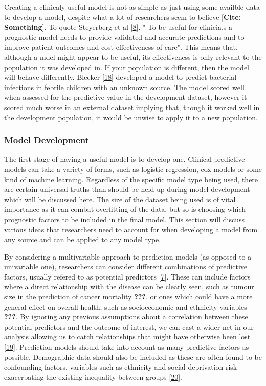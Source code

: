 \documentclass[12pt,PhD,twoside,openright]{muthesis}
\begin{document}
Creating a clinicaly useful model is not as simple as just using some availble data to develop a model, despite what a lot of researchers seem to believe {[}\textbf{Cite: Something}{]}. To quote Steyerberg et al {[}\protect\hyperlink{ref-steyerberg_prognosis_2013}{8}{]}. " To be useful for clinicia,s a prognostic model needs to provide validated and accurate predictions and to improve patient outcomes and cost-effectiveness of care". This means that, although a mdel might appear to be useful, its effectiveness is only relevant to the population it was developed in. If your population is different, then the model will behave differently. Bleeker {[}\protect\hyperlink{ref-bleeker_external_2003}{18}{]} developed a model to predict bacterial infections in febrile children with an unknown source. The model scored well when assessed for the predictive value in the development dataset, however it scored much worse in an external dataset implying that, though it worked well in the development population, it would be unwise to apply it to a new population.

\hypertarget{model-development}{%
\subsubsection{Model Development}\label{model-development}}

The first stage of having a useful model is to develop one. Clinical predictive models can take a variety of forms, such as logistic regression, cox models or some kind of machine learning. Regardless of the specific model type being used, there are certain universal truths than should be held up during model development which will be discussed here. The size of the dataset being used is of vital importance as it can combat overfitting of the data, but so is choosing which prognostic factors to be included in the final model. This section will discuss various ideas that researchers need to account for when developing a model from any source and can be applied to any model type.

By considering a multivariable approach to prediction models (as opposed to a univariable one), researchers can consider different combinations of predictive factors, usually refered to as potential predictors {[}\protect\hyperlink{ref-riley_prognosis_2013}{7}{]}. These can include factors where a direct relationship with the disease can be clearly seen, such as tumour size in the prediction of cancer mortality {\textbf{???}}, or ones which could have a more general effect on overall health, such as socioeconomic and ethnicity variables {\textbf{???}}. By ignoring any previous assumptions about a correlation between these potential predictors and the outcome of interest, we can cast a wider net in our analysis allowing us to catch relationships that might have otherwise been lost {[}\protect\hyperlink{ref-hanauer_exploring_2009}{19}{]}. Prediction models should take into account as many predictive factors as possible. Demographic data should also be included as these are often found to be confounding factors, variables such as ethnicity and social deprivation risk exacerbating the existing inequality between groups {[}\protect\hyperlink{ref-hippisley-cox_predicting_2008}{20}{]}.
\end{document}
